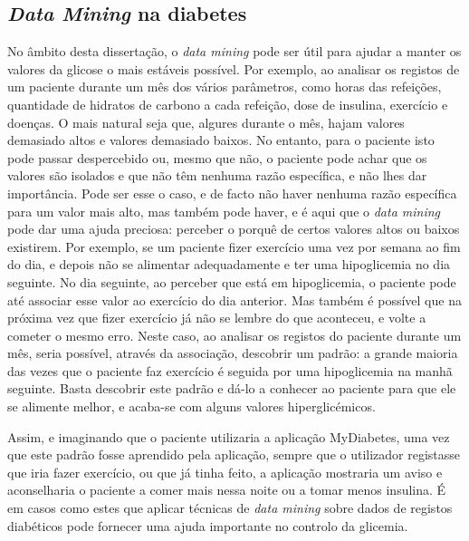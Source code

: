 \subsection{\textit{Data Mining} na diabetes}

No âmbito desta dissertação, o \textit{data mining} pode ser útil para ajudar a manter os valores da glicose o mais estáveis possível. Por exemplo, ao analisar os registos de um paciente durante um mês dos vários parâmetros, como horas das refeições, quantidade de hidratos de carbono a cada refeição, dose de insulina, exercício e doenças. O mais natural seja que, algures durante o mês, hajam valores demasiado altos e valores demasiado baixos. 
No entanto, para o paciente isto pode passar despercebido ou, mesmo que não, o paciente pode achar que os valores são isolados e que não têm nenhuma razão específica, e não lhes dar importância. Pode ser esse o caso, e de facto não haver nenhuma razão específica para um valor mais alto, mas também pode haver, e é aqui que o \textit{data mining} pode dar uma ajuda preciosa:  perceber o porquê de certos valores altos ou baixos existirem. Por exemplo, se um paciente fizer exercício uma vez por semana ao fim do dia, e depois não se alimentar adequadamente e ter uma hipoglicemia no dia seguinte. No dia seguinte, ao perceber que está em hipoglicemia, o paciente pode até associar esse valor ao exercício do dia anterior. Mas também é possível que na próxima vez que fizer exercício já não se lembre do que aconteceu, e volte a cometer o mesmo erro. 
Neste caso, ao analisar os registos do paciente durante um mês, seria possível, através da associação, descobrir um padrão: a grande maioria das vezes que o paciente faz exercício é seguida por uma hipoglicemia na manhã seguinte. Basta descobrir este padrão e dá-lo a conhecer ao paciente para que ele se alimente melhor, e acaba-se com alguns valores hiperglicémicos. 

Assim, e imaginando que o paciente utilizaria a aplicação MyDiabetes, uma vez que este padrão fosse aprendido pela aplicação, sempre que o utilizador registasse que iria fazer exercício, ou que já tinha feito, a aplicação mostraria um aviso e aconselharia o paciente a comer mais nessa noite ou a tomar menos insulina. É em casos como estes que aplicar técnicas de \textit{data mining} sobre dados de registos diabéticos pode fornecer uma ajuda importante no controlo da glicemia.


